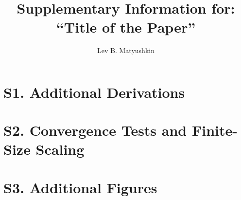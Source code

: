 \documentclass[12pt]{article}
\begin{document}
\title{Supplementary Information for:\\
``Title of the Paper''}
\author{Lev B. Matyushkin}
\date{}
\maketitle

\section*{S1. Additional Derivations}

\section*{S2. Convergence Tests and Finite-Size Scaling}


\section*{S3. Additional Figures}
\end{document}
